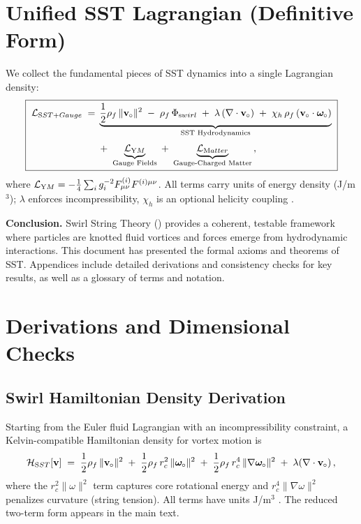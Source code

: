 \documentclass[11pt]{article}
\begin{document}
	\section{Unified SST Lagrangian (Definitive Form)}
	We collect the fundamental pieces of SST dynamics into a single Lagrangian density:
	\[
		\boxed{\;
			\begin{aligned}
				\mathcal{L}_{\textrm SST+Gauge} \;=\; &\underbrace{\frac{1}{2}\rho_f\,\|\mathbf{v}_{\!\!\;\circ}\|^2 \;-\; \rho_f\,\Phi_{\textrm swirl} \;+\; \lambda\,(\nabla\cdot\mathbf{v}_{\!\!\;\circ}) \;+\; \chi_h\,\rho_f\,(\mathbf{v}_{\!\!\;\circ}\cdot\boldsymbol{\omega}_{\!\!\;\circ})}_{\text{SST Hydrodynamics}} \\[0.5ex]
				&+\; \underbrace{\mathcal{L}_{\textrm YM}}_{\text{Gauge Fields}} \;+\; \underbrace{\mathcal{L}_{\textrm Matter}}_{\text{Gauge-Charged Matter}}\,,
			\end{aligned}
			\;}
	\]
	where $\mathcal{L}_{\textrm YM} = -\tfrac{1}{4}\sum_i g_i^{-2}F_{\mu\nu}^{(i)}F^{(i)\mu\nu}$. All terms carry units of energy density (J/m$^3$); $\lambda$ enforces incompressibility, $\chi_h$ is an optional helicity coupling \cite{Batchelor1967,Saffman1992,ChoFaddeevNiemi1999,Iskandarani2025Canon034}.

	\bigskip
	\noindent\textbf{Conclusion.} Swirl String Theory (\canonversion) provides a coherent, testable framework where particles are knotted fluid vortices and forces emerge from hydrodynamic interactions. This document has presented the formal axioms and theorems of SST. Appendices include detailed derivations and consistency checks for key results, as well as a glossary of terms and notation.

	\appendix

	\section{Derivations and Dimensional Checks}\label{app:deriv}
	\subsection{Swirl Hamiltonian Density Derivation}
	Starting from the Euler fluid Lagrangian with an incompressibility constraint, a Kelvin-compatible Hamiltonian density for vortex motion is
	\[
		\mathcal{H}_{\textrm SST}[\mathbf{v}] \;=\; \frac{1}{2}\rho_f\,\|\mathbf{v}_{\!\!\;\circ}\|^2 \;+\; \frac{1}{2}\rho_f\,r_c^2\,\|\boldsymbol{\omega}_{\!\!\;\circ}\|^2 \;+\; \frac{1}{2}\rho_f\,r_c^4\,\|\nabla\boldsymbol{\omega}_{\!\!\;\circ}\|^2 \;+\; \lambda(\nabla\cdot\mathbf{v}_{\!\!\;\circ})\,,
	\]
	where the $r_c^2\|\omega\|^2$ term captures core rotational energy and $r_c^4\|\nabla\omega\|^2$ penalizes curvature (string tension). All terms have units J/m$^3$ \cite{Batchelor1967,Saffman1992}. The reduced two-term form appears in the main text.
\end{document}
